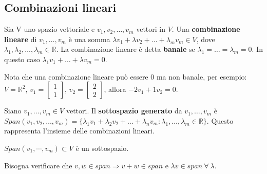 \subsection{Combinazioni lineari}
\begin{definition}
Sia V uno spazio vettoriale e $v_1, v_2, \ldots, v_m$ vettori in $V$. Una \textbf{combinazione lineare} di $v_1, \ldots, v_m$ è una somma $\lambda v_1+ \lambda v_2 + \ldots + \lambda_m v_m \in V$, dove $\lambda_1, \lambda_2, \ldots, \lambda_m \in \mathbb{R}$. La combinazione lineare è detta \textbf{banale} se $\lambda_1 = \ldots = \lambda_m = 0$. In questo caso $\lambda_1 v_1 + \ldots + \lambda v_m = 0$.
\end{definition}

\noindent Nota che una combinazione lineare può essere $0$ ma non banale, per esempio:\\
$V = \mathbb{R}^2$, \hspace{.2cm} $v_1 = \begin{bmatrix}1\\1\end{bmatrix}$, $v_2 = \begin{bmatrix}2\\2\end{bmatrix}$, \hspace{.2cm}allora $-2v_1 + 1v_2 = 0$.

\begin{definition}
Siano $v_1, \ldots, v_m \in V$ vettori. Il \textbf{sottospazio generato} da $v_1, \ldots, v_m$ è $Span(v_1, v_2, \ldots, v_m) = \{\lambda_1 v_1 + \lambda_2 v_2 + \ldots + \lambda_n v_m : \lambda_{1}, \ldots, \lambda_m \in \mathbb{R}\}$. Questo rappresenta l'insieme delle combinazioni lineari.
\end{definition}

\begin{proposition}
$Span(v_1, \cdots, v_m) \subset V$ è un sottospazio.
\end{proposition}

\begin{demostration}
Bisogna verificare che $v, w \in span \Longrightarrow v + w \in span$ e $\lambda v \in span \: \forall \: \lambda$.
\end{demostration}


